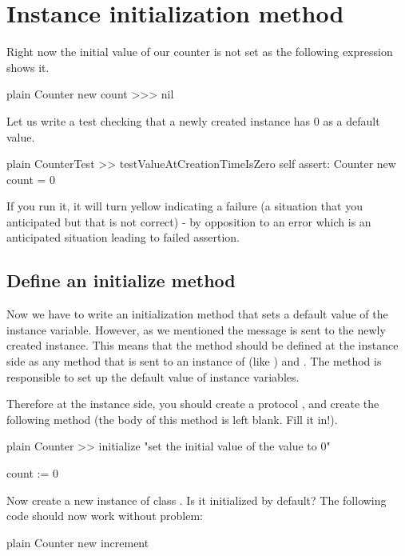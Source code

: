 \documentclass[10pt,twoside,english]{_support/latex/sbabook/sbabook}
\begin{document}
\section{Instance initialization method}
Right now the initial value of our counter is not set as the following expression shows it.

\begin{displaycode}{plain}
Counter new count
>>> nil
\end{displaycode}

Let us write a test checking that a newly created instance has 0 as a default value.

\begin{displaycode}{plain}
CounterTest >> testValueAtCreationTimeIsZero
   self assert: Counter new count = 0
\end{displaycode}

If you run it, it will turn yellow indicating a failure (a situation that you anticipated but that is not correct) - by opposition to an error which is an anticipated situation leading to failed assertion. 
\subsection{Define an initialize method}
Now we have to write an initialization method that sets a default value of the  instance variable. However, as we mentioned the  message is sent to the newly created instance. This means that the  method should be defined at the instance side as any method that is sent to an instance of  (like ) and . The  method is responsible to set up the default value of instance variables.

Therefore at the instance side, you should create a protocol , and create the following method (the body of this method is left blank. Fill it in!).

\begin{displaycode}{plain}
Counter >> initialize
  "set the initial value of the value to 0"
  
  count := 0
\end{displaycode}

Now create a new instance of class . Is it initialized by default? The following code should now work without problem:

\begin{displaycode}{plain}
Counter new increment
\end{displaycode}
\end{document}
